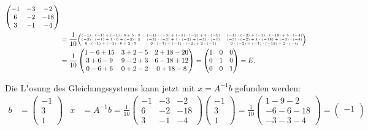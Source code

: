 \begin{loesung}
\begin{teilaufgaben}
\begin{align*}
\begin{pmatrix}
-1&-3& -2\\
 6&-2&-18\\
 3&-1& -4
\end{pmatrix}
\\
&=
\frac1{10}
{
\tiny
\begin{pmatrix}
(-1)\cdot(-1) + (-1)\cdot6 + 5\cdot3
	&(-1)\cdot(-3) + (-1)\cdot(-2) + 5\cdot(-1)
		&(-1)\cdot(-2) + (-1)\cdot(-18) + 5\cdot(-4)\\
(-3)\cdot(-1) + 1\cdot6 + (-3)\cdot3
	&(-3)\cdot(-3) + 1\cdot(-2) + (-3)\cdot(-1)
		&(-3)\cdot(-2) + 1\cdot(-18) + (-3)\cdot(-4)\\
0\cdot(-1) + (-1)\cdot6 + 2\cdot3
	&0\cdot(-3) + (-1)\cdot(-2) + 2\cdot(-1)
		&0\cdot(-2) + (-1)\cdot(-18) + 2\cdot(-4)
\end{pmatrix}
}
\\
&=
\frac1{10}
\begin{pmatrix}
1-6+15 & 3+2-5 & 2 +18 - 20\\
3+6-9  & 9 -2+3& 6-18+12\\
0-6+6  & 0+2-2&0+18-8
\end{pmatrix}
=\begin{pmatrix}
1&0&0\\
0&1&0\\
0&0&1
\end{pmatrix}=E.
\end{align*}
\item Die L"osung des Gleichungssystems kann jetzt mit $x=A^{-1}b$ gefunden
werden:
\begin{align*}
b&=
\begin{pmatrix}-1\\3\\1\end{pmatrix}
&
x&=A^{-1}b=
\frac1{10}
\begin{pmatrix}
-1&-3& -2\\
 6&-2&-18\\
 3&-1& -4
\end{pmatrix}
\begin{pmatrix}-1\\ 3\\ 1\end{pmatrix}
=
\frac1{10}
\begin{pmatrix}
 1-9-2\\
-6-6-18\\
-3-3-4
\end{pmatrix}
=
\begin{pmatrix}
-1\\

\end{pmatrix}
\end{align*}
\end{teilaufgaben}
\end{loesung}

